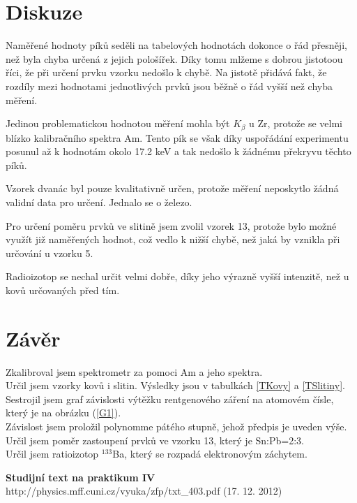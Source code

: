 \documentclass[a4paper,12pt]{article}
\begin{document}
\section{Diskuze}
Naměřené hodnoty píků seděli na tabelových hodnotách dokonce o řád přesněji, než byla chyba určená z jejich pološířek. Díky tomu mlžeme s dobrou jistotoou říci, že při určení prvku vzorku nedošlo k chybě. Na jistotě přidává fakt, že rozdíly mezi hodnotami jednotlivých prvků jsou běžně o řád vyšší než chyba měření. 

Jedinou problematickou hodnotou měření mohla být $K_\beta$ u Zr, protože se velmi blízko kalibračního spektra Am. Tento pík se však díky uspořádání experimentu posunul až k hodnotám okolo 17.2 keV a tak nedošlo k žádnému překryvu těchto píků. 

Vzorek dvanác byl pouze kvalitativně určen, protože měření neposkytlo žádná validní data pro určení. Jednalo se o železo.

Pro určení poměru prvků ve slitině jsem zvolil vzorek 13, protože bylo možné využít již naměřených hodnot, což vedlo k nižší chybě, než jaká by vznikla při určování u vzorku 5.

Radioizotop se nechal určit velmi dobře, díky jeho výrazně vyšší intenzitě, než u kovů určovaných před tím.

\section{Závěr}
Zkalibroval jsem spektrometr za pomoci Am a jeho spektra. \\
Určil jsem vzorky kovů i slitin. Výsledky jsou v tabulkách \ref{TKovy} a \ref{TSlitiny}.
Sestrojil jsem graf závislosti výtěžku rentgenového záření na atomovém čísle, který je na obrázku (\ref{G1}). \\
Závislost jsem proložil polynomme pátého stupně, jehož předpis je uveden výše. \\
Určil jsem poměr zastoupení prvků ve vzorku 13, který je Sn:Pb=2:3. \\
Určil jsem ratioizotop $^{133}$Ba, který se rozpadá elektronovým záchytem.


\begin{thebibliography}{5}
	 \textbf{Studijní text na praktikum IV} \\http://physics.mff.cuni.cz/vyuka/zfp/txt\_403.pdf (17. 12. 2012)
\end{thebibliography}
\end{document}
